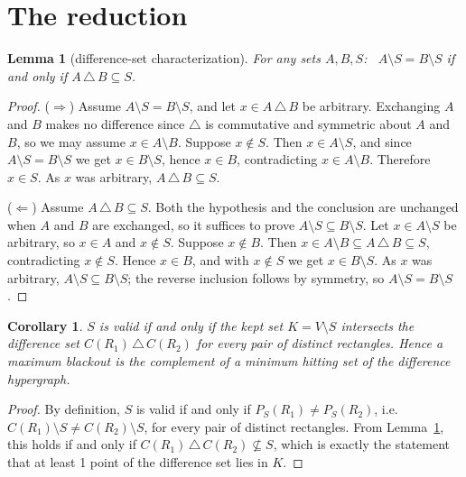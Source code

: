 \documentclass[12pt]{article}
\newtheorem{lemma}{Lemma}
\newtheorem{corollary}{Corollary}
\theoremstyle{definition}\newtheorem{definition}{Definition}
\theoremstyle{remark}\newtheorem{remark}{Remark}
\newcommand{\pres}{P_S}
\begin{document}
\section{The reduction}\label{sec:reduction}
\begin{lemma}[difference-set characterization]\label{lem:reduction}
For any sets $A,B,S$: \ $A\setminus S=B\setminus S$ if and only if
$A\,\triangle\,B\subseteq S$.
\end{lemma}
\begin{proof}

($\Rightarrow$) Assume $A\setminus S=B\setminus S$, and let $x\in A\,\triangle\,B$ be
arbitrary. Exchanging $A$ and $B$ makes no difference since $\triangle$ is commutative and symmetric about $A$ and $B$, so we may assume $x\in A\setminus B$. Suppose $x\notin S$. Then
$x\in A\setminus S$, and since $A\setminus S=B\setminus S$ we get $x\in B\setminus S$,
hence $x\in B$, contradicting $x\in A\setminus B$. Therefore $x\in S$. As $x$ was
arbitrary, $A\,\triangle\,B\subseteq S$.

\smallskip

($\Leftarrow$) Assume $A \,\triangle\, B \subseteq S$. Both the hypothesis and the
conclusion are unchanged when $A$ and $B$ are exchanged, so it suffices to prove
$A \setminus S \subseteq B \setminus S$. Let $x \in A \setminus S$ be arbitrary, so
$x \in A$ and $x \notin S$. Suppose $x \notin B$. Then $x \in A \setminus B \subseteq
A \,\triangle\, B \subseteq S$, contradicting $x \notin S$. Hence $x \in B$, and with
$x \notin S$ we get $x \in B \setminus S$. As $x$ was arbitrary,
$A \setminus S \subseteq B \setminus S$; the reverse inclusion follows by symmetry, so
$A \setminus S = B \setminus S$.
\end{proof}

\begin{corollary}
$S$ is valid if and only if the kept set $K=V\setminus S$ intersects the difference set
$C(R_1)\,\triangle\,C(R_2)$ for every pair of distinct rectangles. Hence a maximum
blackout is the complement of a minimum hitting set of the \emph{difference hypergraph}.
\end{corollary}
\begin{proof}
By definition, $S$ is valid if and only if $\pres(R_1) \neq \pres(R_2)$, i.e. $C(R_1)\setminus S \neq C(R_2)\setminus S$, for every pair of distinct rectangles. From Lemma~\ref{lem:reduction}, this holds if and only if $C(R_1)\,\triangle\,C(R_2) \not\subseteq S$, which is exactly the statement that at least 1 point of the difference set lies in $K$.
\end{proof}
\end{document}

